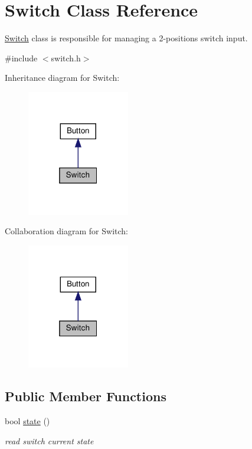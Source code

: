 \hypertarget{class_switch}{}\section{Switch Class Reference}
\label{class_switch}


\hyperlink{class_switch}{Switch} class is responsible for managing a 2-\/positions switch input.  




{\ttfamily \#include $<$switch.\+h$>$}



Inheritance diagram for Switch\+:\nopagebreak
\begin{figure}[H]
\begin{center}
\leavevmode
\includegraphics[width=127pt]{class_switch__inherit__graph}
\end{center}
\end{figure}


Collaboration diagram for Switch\+:\nopagebreak
\begin{figure}[H]
\begin{center}
\leavevmode
\includegraphics[width=127pt]{class_switch__coll__graph}
\end{center}
\end{figure}
\subsection*{Public Member Functions}
\begin{DoxyCompactItemize}
\item 
bool \hyperlink{class_switch_ac9b4369bd630f9d975f2bd82933f7cc6}{state} ()
\begin{DoxyCompactList}\small\item\em read switch current state \end{DoxyCompactList}\end{DoxyCompactItemize}


